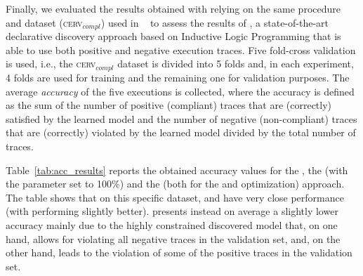 Finally, we evaluated the results obtained with \nd relying on the same procedure and dataset (\textsc{cerv$_{compl}$}) used in ~\cite{2007b-Lamma} to assess the results of \decminer, a state-of-the-art declarative discovery approach based on Inductive Logic Programming that is able to use both positive and negative execution traces. 
Five fold-cross validation is used, i.e., the \textsc{cerv$_{compl}$} dataset is divided into 5 folds and, in each experiment, 4 folds are used for training and the remaining one for validation purposes. The average \emph{accuracy} of the five executions is collected, where the accuracy is defined as the sum of the number of positive (compliant) traces that are (correctly) satisfied by the learned model and the number of negative (non-compliant) traces that are (correctly) violated by the learned model divided by the total number of traces. 
\begin{table} [b]
	\centering
		\caption{Accuracy results obtained with \declareminer, \decminer and \nd}
		\label{tab:acc_results}
\end{table}

Table~\ref{tab:acc_results} reports the obtained accuracy values for the \decminer, the \declareminer (with the  parameter set to 100\%) and the \nd (both for the \minclos and \subsetclos optimization) approach. The table shows that on this specific dataset, \nd and \decminer have very close performance (with \nd \minclos performing slightly better). \declareminer presents instead on average a slightly lower accuracy mainly due to the highly constrained discovered model that, on one hand, allows for violating all negative traces in the validation set, and, on the other hand, leads to the violation of some of the positive traces in the validation set.




